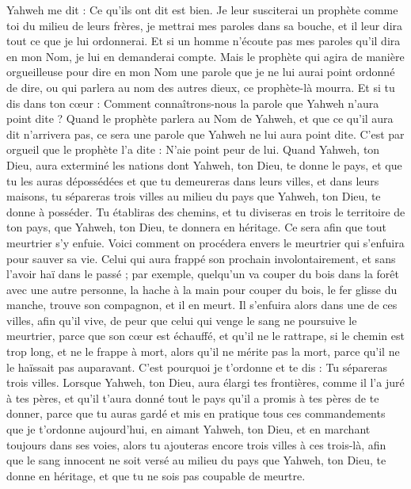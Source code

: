 \begin{multicols}{2}
Yahweh me dit : Ce qu'ils ont dit est bien.
Je leur susciterai un prophète comme toi du milieu de leurs frères, je mettrai mes paroles dans sa bouche, et il leur dira tout ce que je lui ordonnerai.
Et si un homme n'écoute pas mes paroles qu'il dira en mon Nom, je lui en demanderai compte.
Mais le prophète qui agira de manière orgueilleuse pour dire en mon Nom une parole que je ne lui aurai point ordonné de dire, ou qui parlera au nom des autres dieux, ce prophète-là mourra.
Et si tu dis dans ton cœur : Comment connaîtrons-nous la parole que Yahweh n'aura point dite ?
Quand le prophète parlera au Nom de Yahweh, et que ce qu'il aura dit n'arrivera pas, ce sera une parole que Yahweh ne lui aura point dite. C'est par orgueil que le prophète l'a dite : N'aie point peur de lui.
\VerseOne{}Quand Yahweh, ton Dieu, aura exterminé les nations dont Yahweh, ton Dieu, te donne le pays, et que tu les auras dépossédées et que tu demeureras dans leurs villes, et dans leurs maisons,
tu sépareras trois villes au milieu du pays que Yahweh, ton Dieu, te donne à posséder.
Tu établiras des chemins, et tu diviseras en trois le territoire de ton pays, que Yahweh, ton Dieu, te donnera en héritage. Ce sera afin que tout meurtrier s'y enfuie.
Voici comment on procédera envers le meurtrier qui s'enfuira pour sauver sa vie. Celui qui aura frappé son prochain involontairement, et sans l'avoir haï dans le passé ;
par exemple, quelqu'un va couper du bois dans la forêt avec une autre personne, la hache à la main pour couper du bois, le fer glisse du manche, trouve son compagnon, et il en meurt. Il s'enfuira alors dans une de ces villes, afin qu'il vive,
de peur que celui qui venge le sang ne poursuive le meurtrier, parce que son cœur est échauffé, et qu'il ne le rattrape, si le chemin est trop long, et ne le frappe à mort, alors qu'il ne mérite pas la mort, parce qu'il ne le haïssait pas auparavant.
C'est pourquoi je t'ordonne et te dis : Tu sépareras trois villes.
Lorsque Yahweh, ton Dieu, aura élargi tes frontières, comme il l'a juré à tes pères, et qu'il t'aura donné tout le pays qu'il a promis à tes pères de te donner,
parce que tu auras gardé et mis en pratique tous ces commandements que je t'ordonne aujourd'hui, en aimant Yahweh, ton Dieu, et en marchant toujours dans ses voies, alors tu ajouteras encore trois villes à ces trois-là,
afin que le sang innocent ne soit versé au milieu du pays que Yahweh, ton Dieu, te donne en héritage, et que tu ne sois pas coupable de meurtre.

\end{multicols}
